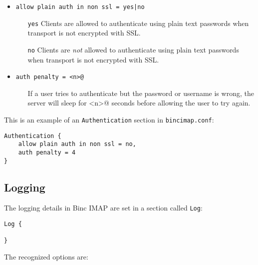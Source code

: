\documentclass[11pt,a4paper,twoside,openright]{report}
\begin{document}
\begin{itemize}

\item \texttt{allow plain auth in non ssl = yes{|}no}
  \begin{itemize}
    \item[\texttt{yes}] Clients are allowed to authenticate using
      plain text passwords when transport is not encrypted with SSL.
    \item[\texttt{no}] Clients are \textit{not} allowed to
      authenticate using plain text passwords when transport is not
      encrypted with SSL.
  \end{itemize}

\item \texttt{auth penalty = \Verb@<n>@}
  \begin{itemize}
    \item [] If a user tries to authenticate but the password or
      username is wrong, the server will sleep for \Verb@<n>@ seconds
      before allowing the user to try again.
  \end{itemize}
\end{itemize}
This is an example of an \texttt{Authentication} section in
\texttt{bincimap.conf}:

\begin{Verbatim}
Authentication {
    allow plain auth in non ssl = no,
    auth penalty = 4
}
\end{Verbatim}

\subsection{Logging}

The logging details in Binc IMAP are set in a section called \texttt{Log}:

\begin{Verbatim}
Log {

}
\end{Verbatim}
The recognized options are:
\end{document}
